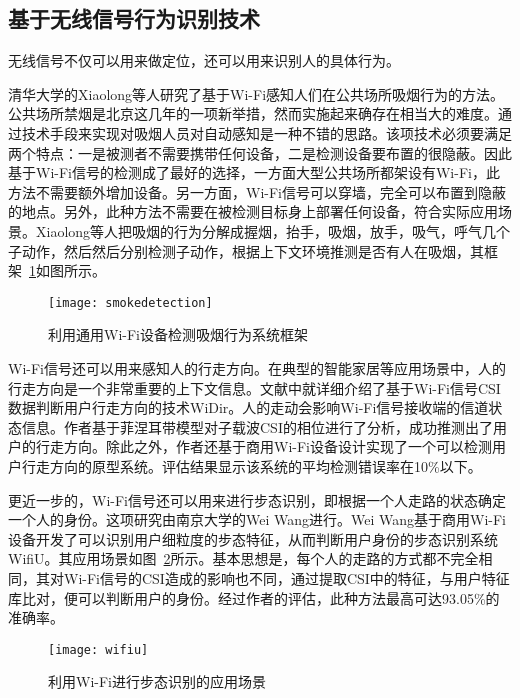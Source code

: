 
\subsection{基于无线信号行为识别技术}
无线信号不仅可以用来做定位，还可以用来识别人的具体行为。

清华大学的Xiaolong等人研究了基于Wi-Fi感知人们在公共场所吸烟行为的方法。公共场所禁烟是北京这几年的一项新举措，然而实施起来确存在相当大的难度。通过技术手段来实现对吸烟人员对自动感知是一种不错的思路。该项技术必须要满足两个特点：一是被测者不需要携带任何设备，二是检测设备要布置的很隐蔽。因此基于Wi-Fi信号的检测成了最好的选择，一方面大型公共场所都架设有Wi-Fi，此方法不需要额外增加设备。另一方面，Wi-Fi信号可以穿墙，完全可以布置到隐蔽的地点。另外，此种方法不需要在被检测目标身上部署任何设备，符合实际应用场景。Xiaolong等人把吸烟的行为分解成握烟，抬手，吸烟，放手，吸气，呼气几个子动作，然后然后分别检测子动作，根据上下文环境推测是否有人在吸烟，其框架~\ref{fig:smokedetection}如图所示。

\begin{figure}[htbp] %
  \centering
  \texttt{[image: smokedetection]}
  \caption{利用通用Wi-Fi设备检测吸烟行为系统框架}
  \label{fig:smokedetection}
\end{figure}

Wi-Fi信号还可以用来感知人的行走方向。在典型的智能家居等应用场景中，人的行走方向是一个非常重要的上下文信息。文献\cite{wu2016widir}中就详细介绍了基于Wi-Fi信号CSI数据判断用户行走方向的技术WiDir。人的走动会影响Wi-Fi信号接收端的信道状态信息。作者基于菲涅耳带模型对子载波CSI的相位进行了分析，成功推测出了用户的行走方向。除此之外，作者还基于商用Wi-Fi设备设计实现了一个可以检测用户行走方向的原型系统。评估结果显示该系统的平均检测错误率在10\%以下。

更近一步的，Wi-Fi信号还可以用来进行步态识别，即根据一个人走路的状态确定一个人的身份。这项研究由南京大学的Wei Wang进行。Wei Wang基于商用Wi-Fi设备开发了可以识别用户细粒度的步态特征，从而判断用户身份的步态识别系统WifiU。其应用场景如图~\ref{fig:wifiu}所示。基本思想是，每个人的走路的方式都不完全相同，其对Wi-Fi信号的CSI造成的影响也不同，通过提取CSI中的特征，与用户特征库比对，便可以判断用户的身份。经过作者的评估，此种方法最高可达93.05\%的准确率。
\begin{figure}[htbp] %
  \centering
  \texttt{[image: wifiu]}
  \caption{利用Wi-Fi进行步态识别的应用场景}
  \label{fig:wifiu}
\end{figure}



